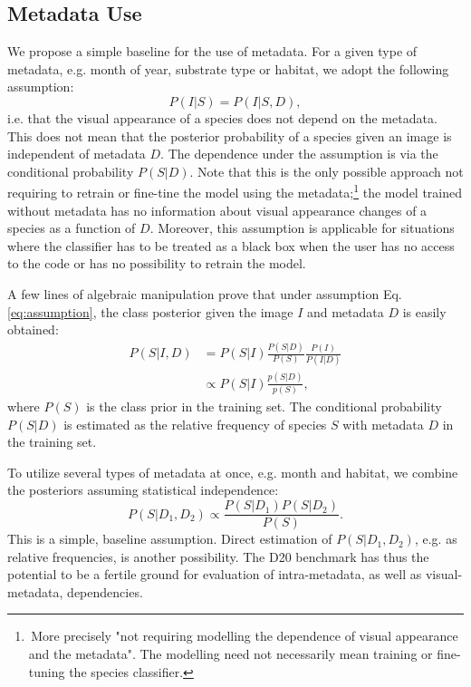 \documentclass[10pt,twocolumn,letterpaper]{article}
\begin{document}
\subsection{Metadata Use}
\label{metadata_usage}
We propose a simple baseline for the use of metadata.
For a given type of metadata, e.g. month of year, substrate type or habitat, we adopt the following assumption:
\begin{equation}
P(I|S) = P(I|S,D),
\label{eq:assumption}
\end{equation}
i.e. that the visual appearance of a species does not depend on the metadata.
This does not mean that the posterior probability of a species given an image is independent of metadata $D$. The dependence under the assumption is via the conditional probability $P(S|D)$.
Note that this is the only possible approach not requiring to retrain or fine-tine the model using the metadata;\footnote{\,More precisely "not requiring modelling the dependence of visual appearance and the metadata". The modelling need not necessarily mean training or fine-tuning the species classifier.}
the model trained without metadata has no information about visual appearance changes of a species as a function of $D$. Moreover, this assumption is applicable for situations where the classifier has to be treated as a black box when the user has no access to the code or has no possibility to retrain the model.

A few lines of algebraic manipulation prove  
 that under assumption Eq. \eqref{eq:assumption}, the class posterior given the image $I$ and metadata $D$ is easily obtained:
\begin{equation}
\begin{aligned}
  P(S|I,D)  & =       P(S|I) \frac{P(S|D)}{P(S)}\frac{P(I)}{P(I|D)} \\
            & \propto P(S|I) \frac{p(S|D)}{p(S)},
\label{eq:posterior-given-meta}
\end{aligned}
\end{equation}
where $P(S)$ is the class prior in the training set.
The conditional probability $P(S|D)$ is estimated as the relative frequency of species $S$ with metadata $D$ in the training set.

To utilize several types of metadata at once, e.g. month and habitat, we combine the posteriors assuming statistical independence:
\begin{equation}
    P (S | D_1,D_2) \propto \frac{P (S | D_1 ) P(S|D_2)}{P(S)}.
\end{equation}
This is a simple, baseline assumption. Direct estimation of $P(S | D_1,D_2)$, e.g. as relative frequencies, is another possibility. The D20 benchmark has thus the potential to be a fertile ground for evaluation of intra-metadata, as well as visual-metadata, dependencies.
\end{document}
